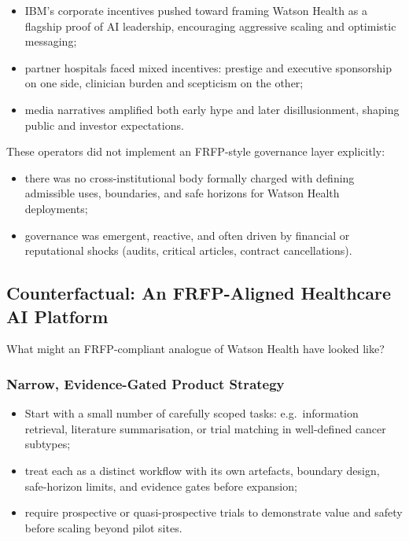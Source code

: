 \begin{itemize}
\item IBM’s corporate incentives pushed toward framing Watson Health as a flagship proof of AI leadership,
        encouraging aggressive scaling and optimistic messaging;
  \item partner hospitals faced mixed incentives: prestige and executive sponsorship on one side,
        clinician burden and scepticism on the other;
  \item media narratives amplified both early hype and later disillusionment, shaping public and investor expectations.

\end{itemize}

These operators did not implement an FRFP-style governance layer explicitly:

\begin{itemize}
  \item there was no cross-institutional body formally charged with defining
        admissible uses, boundaries, and safe horizons for Watson Health
        deployments;
  \item governance was emergent, reactive, and often driven by financial or
        reputational shocks (audits, critical articles, contract
        cancellations).
\end{itemize}

\subsection{Counterfactual: An FRFP-Aligned Healthcare AI Platform}

What might an FRFP-compliant analogue of Watson Health have looked like?

\subsubsection*{Narrow, Evidence-Gated Product Strategy}

\begin{itemize}
  \item Start with a small number of carefully scoped tasks:
        e.g.\ information retrieval, literature summarisation, or trial
        matching in well-defined cancer subtypes;
\item treat each as a distinct workflow with its own artefacts, boundary design, safe-horizon limits,
        and evidence gates before expansion;
  \item require prospective or quasi-prospective trials to demonstrate value
        and safety before scaling beyond pilot sites.
\end{itemize}

